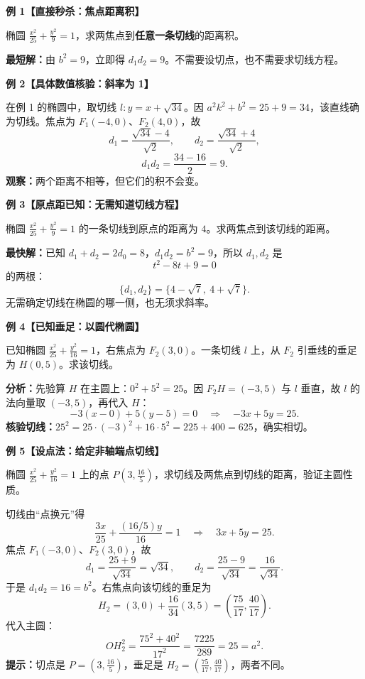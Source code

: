 \begin{examplebox}
\textbf{例 1【直接秒杀：焦点距离积】}

椭圆 $\frac{x^2}{25}+\frac{y^2}{9}=1$，求两焦点到\textbf{任意一条切线}的距离积。

\textbf{最短解：}由 $b^2=9$，立即得 $\boxed{d_1d_2=9}$。不需要设切点，也不需要求切线方程。

\medskip
\textbf{例 2【具体数值核验：斜率为 1】}

在例 1 的椭圆中，取切线 $l:y=x+\sqrt{34}$。因 $a^2k^2+b^2=25+9=34$，该直线确为切线。焦点为 $F_1(-4,0)$、$F_2(4,0)$，故
\[
d_1=\frac{\sqrt{34}-4}{\sqrt2},\qquad
d_2=\frac{\sqrt{34}+4}{\sqrt2},
\]
\[
d_1d_2=\frac{34-16}{2}=\boxed{9}.
\]
\textbf{观察：}两个距离不相等，但它们的积不会变。

\medskip
\textbf{例 3【原点距已知：无需知道切线方程】}

椭圆 $\frac{x^2}{25}+\frac{y^2}{9}=1$ 的一条切线到原点的距离为 $4$。求两焦点到该切线的距离。

\textbf{最快解：}已知 $d_1+d_2=2d_0=8$，$d_1d_2=b^2=9$，所以 $d_1,d_2$ 是
\[
t^2-8t+9=0
\]
的两根：
\[
\boxed{\{d_1,d_2\}=\{4-\sqrt7,\ 4+\sqrt7\}}.
\]
无需确定切线在椭圆的哪一侧，也无须求斜率。

\medskip
\textbf{例 4【已知垂足：以圆代椭圆】}

已知椭圆 $\frac{x^2}{25}+\frac{y^2}{16}=1$，右焦点为 $F_2(3,0)$。一条切线 $l$ 上，从 $F_2$ 引垂线的垂足为 $H(0,5)$。求该切线。

\textbf{分析：}先验算 $H$ 在主圆上：$0^2+5^2=25$。因 $F_2H=(-3,5)$ 与 $l$ 垂直，故 $l$ 的法向量取 $(-3,5)$，再代入 $H$：
\[
-3(x-0)+5(y-5)=0
\quad\Longrightarrow\quad
\boxed{-3x+5y=25}.
\]
\textbf{核验切线：}$25^2=25\cdot(-3)^2+16\cdot5^2=225+400=625$，确实相切。

\medskip
\textbf{例 5【设点法：给定非轴端点切线】}

椭圆 $\frac{x^2}{25}+\frac{y^2}{16}=1$ 上的点 $P(3,\frac{16}{5})$，求切线及两焦点到切线的距离，验证主圆性质。

切线由“点换元”得
\[
\frac{3x}{25}+\frac{(16/5)y}{16}=1
\quad\Longrightarrow\quad\boxed{3x+5y=25}.
\]
焦点 $F_1(-3,0)$、$F_2(3,0)$，故
\[
d_1=\frac{25+9}{\sqrt{34}}=\sqrt{34},\qquad
d_2=\frac{25-9}{\sqrt{34}}=\frac{16}{\sqrt{34}}.
\]
于是 $\boxed{d_1d_2=16=b^2}$。右焦点向该切线的垂足为
\[
H_2=(3,0)+\frac{16}{34}(3,5)
=\left(\frac{75}{17},\frac{40}{17}\right).
\]
代入主圆：
\[
OH_2^2=\frac{75^2+40^2}{17^2}=\frac{7225}{289}=25=a^2.
\]
\textbf{提示：}切点是 $P=(3,\frac{16}{5})$，垂足是 $H_2=(\frac{75}{17},\frac{40}{17})$，两者不同。


\end{examplebox}

